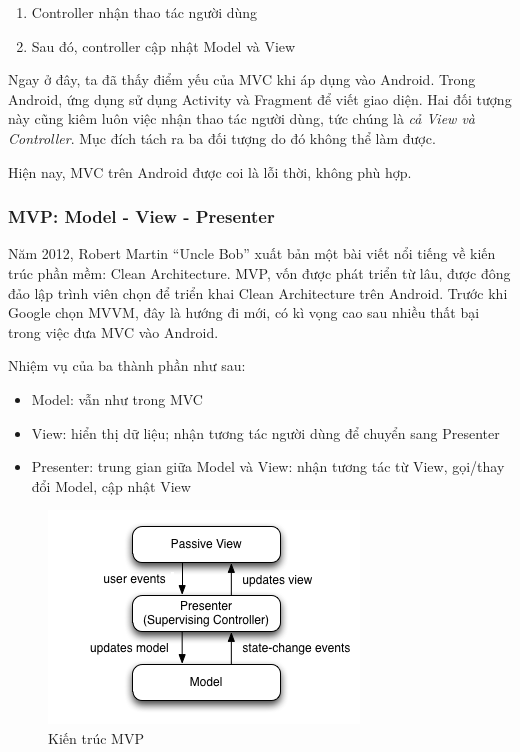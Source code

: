 \documentclass[../../thesis]{subfiles}
\begin{document}
\begin{enumerate}
    \item
        Controller nhận thao tác người dùng
    \item
        Sau đó, controller cập nhật Model và View
\end{enumerate}

Ngay ở đây, ta đã thấy điểm yếu của MVC khi áp dụng vào Android. Trong Android,
ứng dụng sử dụng Activity và Fragment để viết giao diện. Hai đối tượng này cũng
kiêm luôn việc nhận thao tác người dùng, tức chúng là \emph{cả View và
Controller}. Mục đích tách ra ba đối tượng do đó không thể làm được.

Hiện nay, MVC trên Android được coi là lỗi thời, không phù hợp.

\subsubsection{MVP: Model - View - Presenter}

Năm 2012, Robert Martin ``Uncle Bob'' xuất bản một bài viết nổi tiếng về kiến
trúc phần mềm: Clean Architecture. MVP, vốn được phát triển từ lâu, được đông
đảo lập trình viên chọn để triển khai Clean Architecture trên Android. Trước khi
Google chọn MVVM, đây là hướng đi mới, có kì vọng cao sau nhiều thất bại trong
việc đưa MVC vào Android.

Nhiệm vụ của ba thành phần như sau:

\begin{itemize}
    \item
        Model: vẫn như trong MVC
    \item
        View: hiển thị dữ liệu; nhận tương tác người dùng để chuyển sang
        Presenter
    \item
        Presenter: trung gian giữa Model và View: nhận tương tác từ View,
        gọi/thay đổi Model, cập nhật View
\end{itemize}

\begin{figure}
    \centering
    \vspace*{-10mm}
    \includegraphics[width=\linewidth]{../images/Model_View_Presenter_GUI_Design_Pattern.png}
    \vspace*{-10mm}
    \caption{Kiến trúc MVP \cite{WIKI_MVP}}
    \label{fig:mvp}
\end{figure}
\end{document}
